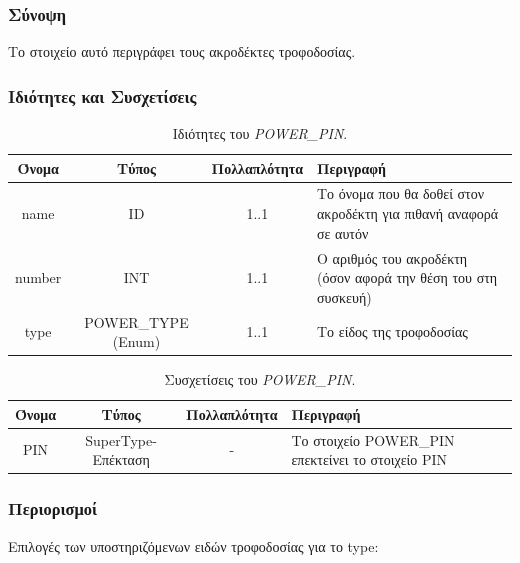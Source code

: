 \subsubsection*{Σύνοψη}

\noindent Το στοιχείο αυτό περιγράφει τους ακροδέκτες τροφοδοσίας.

\subsubsection*{Ιδιότητες και Συσχετίσεις}

\begin{table}[H]
	\begin{center}
		\caption{Ιδιότητες του \textit{POWER\_PIN}.}
		\label{tab:power_pin1}
		\begin{tabular}{ | c | c | c| m{5.5cm} | }
			\hline
			\rowcolor{Gray}
			Όνομα & Τύπος & Πολλαπλότητα & Περιγραφή \\
			\hline
			name & ID & 1..1 & Το όνομα που θα δοθεί στον ακροδέκτη για πιθανή αναφορά σε αυτόν \\
			\hline
			number & INT & 1..1 & Ο αριθμός του ακροδέκτη (όσον αφορά την θέση του στη συσκευή) \\
			\hline
			type & POWER\_TYPE (Enum) & 1..1 & Το είδος της τροφοδοσίας \\
			\hline
		\end{tabular}
	\end{center}
\end{table}

\begin{table}[H]
	\begin{center}
		\caption{Συσχετίσεις του \textit{POWER\_PIN}.}
		\label{tab:power_pin2}
		\begin{tabular}{ | c | c | c| m{5.5cm} | }
			\hline
			\rowcolor{Gray}
			Όνομα & Τύπος & Πολλαπλότητα & Περιγραφή \\
			\hline
			PIN & SuperType-Επέκταση & - &  Το στοιχείο POWER\_PIN επεκτείνει το στοιχείο PIN \\
			\hline
		\end{tabular}
	\end{center}
\end{table}

\subsubsection*{Περιορισμοί}

\noindent Επιλογές των υποστηριζόμενων ειδών τροφοδοσίας για το type:

